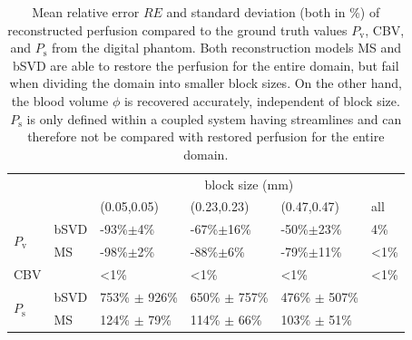 \documentclass[journal,twocolumn]{IEEEtran}
\newcommand{\Perfv}{P_{\mathrm{v}}}
\newcommand{\Perfs}{P_{\mathrm{s}}}
\begin{document}
	\begin{table}[h!tb]
		\scriptsize
		\caption{Mean relative error $RE$ and standard deviation (both in \%) of reconstructed perfusion compared to the ground truth values $\Perfv$, CBV, and $\Perfs$ from the digital phantom. Both reconstruction models MS and bSVD are able to restore the perfusion for the entire domain, but fail when dividing the domain into smaller block sizes. On the other hand, the blood volume $\phi$ is recovered accurately, independent of block size. $\Perfs$ is only defined within a coupled system having streamlines and can therefore not be compared with restored perfusion for the entire domain.
		} 
		\centering
		\begin{tabular}{p{.3cm} l l l l l}
			& & \multicolumn{4}{c}{block size (\si{\mm})} \\
										& 		& (0.05,0.05) 		& (0.23,0.23) 	& 	(0.47,0.47)			& all \\ \toprule
			\multirow{2}{*}{$\Perfv$}	& bSVD 	& -93\%$\pm$4\% 	& -67\%$\pm$16\%	& -50\%$\pm$23\%	& 4\% 	\\ 
									   	& MS 	& -98\%$\pm$2\% 	& -88\%$\pm$6\%		& -79\%$\pm$11\%	& <1\% 	\\ \midrule
									CBV & 		& <1\% 				& <1\% 				& <1\% 				& <1\% 	\\ \midrule
			\multirow{2}{*}{$\Perfs$}	& bSVD	& 753\% $\pm$ 926\%	& 650\% $\pm$ 757\%	& 476\% $\pm$ 507\% & 		\\
										& MS 	& 124\% $\pm$ 79\%  & 114\% $\pm$ 66\%	& 103\% $\pm$ 51\% 	& 		\\
		\end{tabular}
		
		\label{tab:resultsSim}
	\end{table}
	
\end{document}
